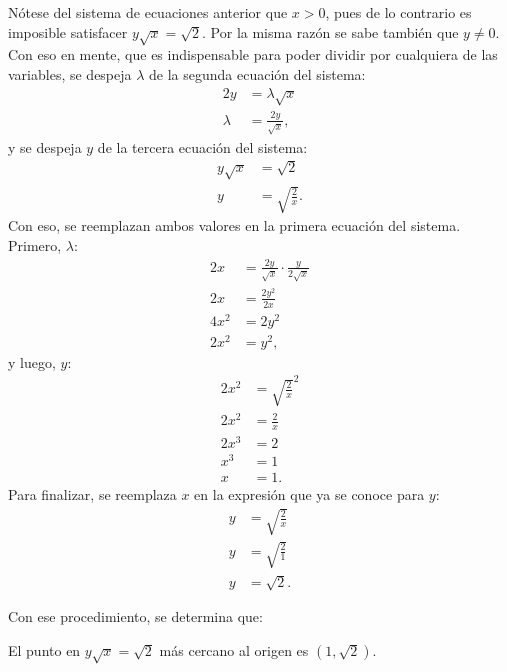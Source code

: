 \documentclass{fmbvecto}
\begin{document}
\begin{problema}
Nótese del sistema de ecuaciones anterior que \(x > 0\), pues de lo contrario es imposible satisfacer \(y\sqrt{x} = \sqrt{2}\). Por la misma razón se sabe también que \(y \neq 0\). Con eso en mente, que es indispensable para poder dividir por cualquiera de las variables, se despeja \(\lambda\) de la segunda ecuación del sistema:
\begin{align*}
    2y &= \lambda \sqrt{x} \\
     \lambda &= \frac{2y}{\sqrt{x}},
\end{align*}
y se despeja \(y\) de la tercera ecuación del sistema:
\begin{align*}
    y\sqrt{x} &= \sqrt{2} \\
    y &= \sqrt{\frac{2}{x}}.
\end{align*}
Con eso, se reemplazan ambos valores en la primera ecuación del sistema. Primero,  \(\lambda\):
\begin{align*}
    2x &= \frac{2y}{\sqrt{x}} \cdot \frac{y}{2\sqrt{x}} \\
    2x &= \frac{2y^2}{2x} \\
    4x^2 &= 2y^2 \\
    2x^2 &= y^2,
\end{align*}
y luego, \(y\):
\begin{align*}
    2x^2 &= \sqrt{\frac{2}{x}}^2 \\
    2x^2 &= \frac{2}{x}\\
    2x^3 &= 2 \\
    x^3 &= 1 \\
    x &= 1.
\end{align*}
Para finalizar, se reemplaza \(x\) en la expresión que ya se conoce para \(y\):
\begin{align*}
    y &= \sqrt{\frac{2}{x}} \\
    y &= \sqrt{\frac{2}{1}} \\
    y &= \sqrt{2}.
\end{align*}

Con ese procedimiento, se determina que:
\begin{gbox}
    El punto en \(y\sqrt{x} = \sqrt{2}\) más cercano al origen es \((1, \sqrt{2})\).
\end{gbox}

\end{problema}

\phantom{} %
\end{document}
